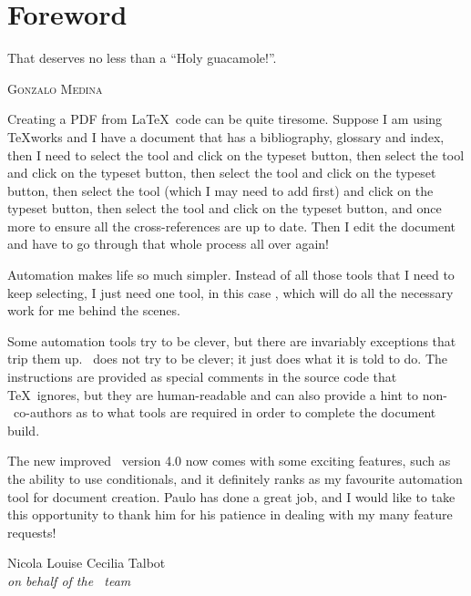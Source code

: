 \chapter*{Foreword}
\label{chap:foreword}

\epigraph{That deserves no less than a ``Holy guacamole!''.}{\textsc{Gonzalo Medina}}

{\setlength{\parskip}{1em}
Creating a PDF from \LaTeX\ code can be quite tiresome. Suppose I am using \TeX works and I have a document that has a bibliography, glossary and index, then I need to select the  tool and click on the typeset button, then select the  tool and click on the typeset button, then select the  tool and click on the typeset button, then select the  tool (which I may need to add first) and click on the typeset button, then select the  tool and click on the typeset button, and once more to ensure all the cross-references are up to date. Then I edit the document and have to go through that whole process all over again!

Automation makes life so much simpler. Instead of all those tools that I need to keep selecting, I just need one tool, in this case \arara, which will do all the necessary work for me behind the scenes.

Some automation tools try to be clever, but there are invariably exceptions that trip them up. \arara\ does not try to be clever; it just does what it is told to do. The instructions are provided as special comments in the source code that \TeX\ ignores, but they are human-readable and can also provide a hint to non-\arara\ co-authors as to what tools are required in order to complete the document build.

The new improved \arara\ version 4.0 now comes with some exciting features, such as the ability to use conditionals, and it definitely ranks as my favourite automation tool for document creation. Paulo has done a great job, and I would like to take this opportunity to thank
him for his patience in dealing with my many feature requests!}

\vfill

\begin{flushright}
Nicola Louise Cecilia Talbot\\
\emph{on behalf of the \arara\ team}
\end{flushright}
